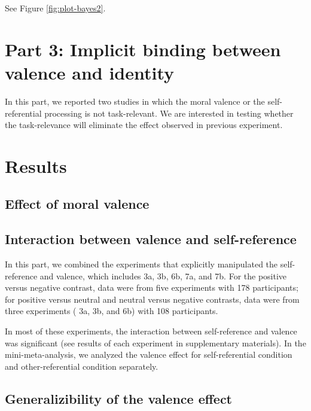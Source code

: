 \documentclass[
  english,
  man]{apa6}
\begin{document}
See Figure \ref{fig:plot-bayes2}.

\hypertarget{part-3-implicit-binding-between-valence-and-identity}{%
\section{Part 3: Implicit binding between valence and identity}\label{part-3-implicit-binding-between-valence-and-identity}}

In this part, we reported two studies in which the moral valence or the self-referential processing is not task-relevant. We are interested in testing whether the task-relevance will eliminate the effect observed in previous experiment.

\hypertarget{results}{%
\section{Results}\label{results}}

\hypertarget{effect-of-moral-valence}{%
\subsection{Effect of moral valence}\label{effect-of-moral-valence}}

\hypertarget{interaction-between-valence-and-self-reference}{%
\subsection{Interaction between valence and self-reference}\label{interaction-between-valence-and-self-reference}}

In this part, we combined the experiments that explicitly manipulated the self-reference and valence, which includes 3a, 3b, 6b, 7a, and 7b. For the positive versus negative contrast, data were from five experiments with 178 participants; for positive versus neutral and neutral versus negative contrasts, data were from three experiments ( 3a, 3b, and 6b) with 108 participants.

In most of these experiments, the interaction between self-reference and valence was significant (see results of each experiment in supplementary materials). In the mini-meta-analysis, we analyzed the valence effect for self-referential condition and other-referential condition separately.

\hypertarget{generalizibility-of-the-valence-effect}{%
\subsection{Generalizibility of the valence effect}\label{generalizibility-of-the-valence-effect}}
\end{document}
